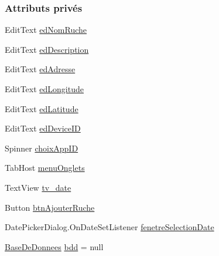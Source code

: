 \subsubsection*{Attributs privés}
\begin{DoxyCompactItemize}
\item 
Edit\+Text \hyperlink{classfr_1_1campus_1_1laurainc_1_1honeybee_1_1_nouvelle_ruche_activity_aa2d4b480f89c9acf2ddcd4e9677ec406}{ed\+Nom\+Ruche}
\item 
Edit\+Text \hyperlink{classfr_1_1campus_1_1laurainc_1_1honeybee_1_1_nouvelle_ruche_activity_afcd95cec0188630bb413ff73033b9785}{ed\+Description}
\item 
Edit\+Text \hyperlink{classfr_1_1campus_1_1laurainc_1_1honeybee_1_1_nouvelle_ruche_activity_a850ff6dbcd4ee64b7eea6aeebd207d98}{ed\+Adresse}
\item 
Edit\+Text \hyperlink{classfr_1_1campus_1_1laurainc_1_1honeybee_1_1_nouvelle_ruche_activity_aa04d930373ba06878d148bdc001d0e7c}{ed\+Longitude}
\item 
Edit\+Text \hyperlink{classfr_1_1campus_1_1laurainc_1_1honeybee_1_1_nouvelle_ruche_activity_a6673109be623a992ac86b6e5aeed8063}{ed\+Latitude}
\item 
Edit\+Text \hyperlink{classfr_1_1campus_1_1laurainc_1_1honeybee_1_1_nouvelle_ruche_activity_a93bbf506f67bb0b5b3308dc3ba715b9d}{ed\+Device\+ID}
\item 
Spinner \hyperlink{classfr_1_1campus_1_1laurainc_1_1honeybee_1_1_nouvelle_ruche_activity_a9e3885704b27199262c12f0349388009}{choix\+App\+ID}
\item 
Tab\+Host \hyperlink{classfr_1_1campus_1_1laurainc_1_1honeybee_1_1_nouvelle_ruche_activity_a65be1931e07c6e8fb9a2cc5468a2b559}{menu\+Onglets}
\item 
Text\+View \hyperlink{classfr_1_1campus_1_1laurainc_1_1honeybee_1_1_nouvelle_ruche_activity_aaca431bc75d86447e4ecbe01cfa9857d}{tv\+\_\+date}
\item 
Button \hyperlink{classfr_1_1campus_1_1laurainc_1_1honeybee_1_1_nouvelle_ruche_activity_a8f755bb104c7db861c3942ceb56519f4}{btn\+Ajouter\+Ruche}
\item 
Date\+Picker\+Dialog.\+On\+Date\+Set\+Listener \hyperlink{classfr_1_1campus_1_1laurainc_1_1honeybee_1_1_nouvelle_ruche_activity_a41f4797d95ad07979e5a1fc7fb061269}{fenetre\+Selection\+Date}
\item 
\hyperlink{classfr_1_1campus_1_1laurainc_1_1honeybee_1_1_base_de_donnees}{Base\+De\+Donnees} \hyperlink{classfr_1_1campus_1_1laurainc_1_1honeybee_1_1_nouvelle_ruche_activity_ad2073e012bfa9acbe78bac9db9d7d0b4}{bdd} = null

\end{DoxyCompactItemize}

